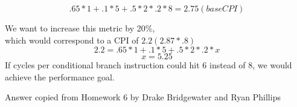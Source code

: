 \documentclass[letterpaper,10pt,onecolumn,titlepage]{article}
\begin{document}
\begin{enumerate}
\begin{mdframed}[style=MyFrame]
\begin{equation}
.65*1 + .1*5 + .5*2 * .2*8 = 2.75 (base CPI)
\end{equation}

We want to increase this metric by 20\%,\\
which would correspond to a CPI of $2.2 (2.87*.8)$\\
\begin{equation}
2.2 = .65*1 + .1*5 + .5*2 * .2*x
\end{equation}
\begin{equation}
x = 5.25
\end{equation}
If cycles per conditional branch instruction could hit 6
instead of 8, we would achieve the performance goal. 

Answer copied from Homework 6 by Drake Bridgewater and Ryan Phillips \cite{HW6}
\end{mdframed}


\end{enumerate}
\end{document}
